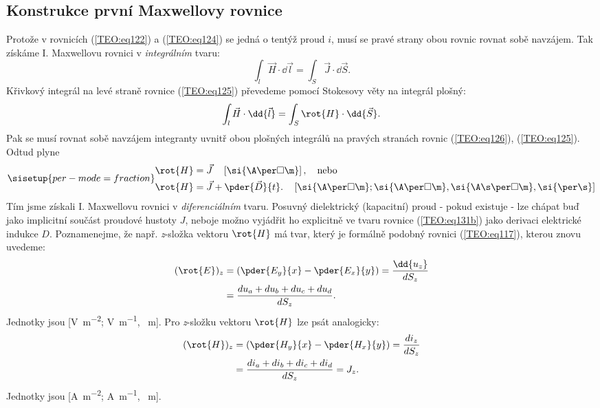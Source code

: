     \subsection{Konstrukce první Maxwellovy rovnice}
      Protože v rovnicích (\ref{TEO:eq122}) a (\ref{TEO:eq124}) se jedná o tentýž 
      proud \(i\), musí se pravé strany obou rovnic rovnat sobě navzájem. Tak získáme I. 
      Maxwellovu rovnici v \emph{integrálním} tvaru:
      \begin{equation}\label{TEO:eq125}
        \int_l \vec{H}\cdot \dd{\vec{l}} = \int_S \vec{J}\cdot \dd{\vec{S}}.
      \end{equation} 
      Křivkový integrál na levé straně rovnice (\ref{TEO:eq125}) převedeme pomocí Stokesovy 
      věty na integrál plošný:	
      \begin{equation}\label{TEO:eq126}
        \int_l \vec{H}\cdot \dd{\vec{l}} = \int_S \rot{H}\cdot \dd{\vec{S}}.
      \end{equation} 
      Pak se musí rovnat sobě navzájem integranty uvnitř obou plošných integrálů na pravých 
      stranách rovnic (\ref{TEO:eq126}), (\ref{TEO:eq125}). Odtud plyne
      \begin{subequations}
        \sisetup{per-mode=fraction}
        \begin{align}
          \rot{H} &= \vec{J}   \quad 
            \left[\si{\A\per\square\m}\right], \quad\text{nebo}              \label{TEO:eq131a} \\
          \rot{H} &= \vec{J} + \pder{\vec{D}}{t}. \quad
          \left[\si{\A\per\square\m}; \si{\A\per\square\m},
            \si{\A\s\per\square\m}, \si{\per\s}\right]                       \label{TEO:eq131b}
        \end{align}
      \end{subequations}
      Tím jsme získali I. Maxwellovu rovnici v \emph{diferenciálním} tvaru. Posuvný dielektrický
      (kapacitní) proud - pokud existuje - lze chápat buď jako implicitní součást proudové hustoty
      \(J\), neboje možno vyjádřit ho explicitně ve tvaru rovnice (\ref{TEO:eq131b}) jako derivaci
      elektrické indukce \(D\). Poznamenejme, že např. \emph{z}-složka vektoru \(\rot{H}\) má tvar,
      který je formálně podobný rovnici (\ref{TEO:eq117}), kterou znovu uvedeme:
      \begin{align*}
         (\rot{E})_z &= \left(\pder{E_y}{x} - \pder{E_x}{y}\right)
                      = \frac{\dd{u_z}}{dS_z}                                                  \\
                     &= \frac{du_a + du_b + du_c + du_d}{dS_z}.
      \end{align*}
      Jednotky jsou [\si{\V\per\m^2}; \si{\V\per\m}, \si{\per\m}]. Pro \emph{z}-složku vektoru
      \(\rot{H}\) lze psát analogicky:
      \begin{align*}
        (\rot{H})_z &= \left(\pder{H_y}{x} - \pder{H_x}{y}\right)
                     = \frac{di_z}{dS_z}                                                   \\
                    &= \frac{di_a + di_b + di_c + di_d}{dS_z} = J_z.
      \end{align*}
      Jednotky jsou [\si{\A\per\m^2}; \si{\A\per\m}, \si{\per\m}].

